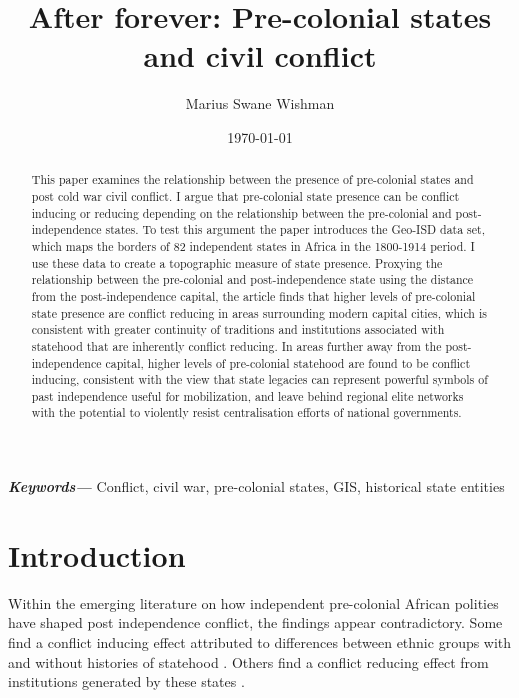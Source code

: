 \documentclass[12pt]{article}
\title{After forever: Pre-colonial states and civil conflict}
\author[1]{Marius Swane Wishman}
\affil[1]{Department of Sociology and Political Science, NTNU}
\date{\today}
\providecommand{\keywords}[1]
{
	\small	
	\textbf{\textit{Keywords---}} #1
}
\begin{document}
\maketitle

\begin{abstract}

This paper examines the relationship between the presence of pre-colonial states
and post cold war civil conflict. I argue that pre-colonial state presence can
be conflict inducing or reducing depending on the relationship between the
pre-colonial and post-independence states. To test this argument the paper
introduces the Geo-ISD data set, which maps the borders of 82 independent states
in Africa in the 1800-1914 period. I use these data to create a topographic
measure of state presence. Proxying the relationship between the pre-colonial
and post-independence state using the distance from the post-independence
capital, the article finds that higher levels of pre-colonial state presence are
conflict reducing in areas surrounding modern capital cities, which is
consistent with greater continuity of traditions and institutions associated
with statehood that are inherently conflict reducing. In areas further away from
the post-independence capital, higher levels of pre-colonial statehood are found
to be conflict inducing, consistent with the view that state legacies can
represent powerful symbols of past independence useful for mobilization, and
leave behind regional elite networks with the potential to violently resist
centralisation efforts of national governments. 

\end{abstract}

\keywords{Conflict, civil war, pre-colonial states, GIS, historical state
entities}


\onehalfspacing


\newpage

\section{Introduction} \label{Introduction}

Within the emerging literature on how independent pre-colonial African polities
have shaped post independence conflict, the findings appear contradictory. Some
find a conflict inducing effect attributed to differences between ethnic groups with
and without histories of statehood \citep{Englebert2002, Paine2019}. Others find
a conflict reducing effect from institutions generated by these states
\citep{Depetris-Chauvin2016, Wig2016}.
\end{document}

